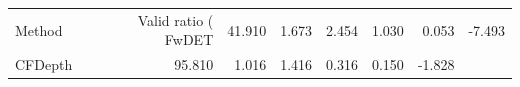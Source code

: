 \begin{tabular}{lrrrrrr}
\toprule
Method & Valid ratio (%
\midrule
FwDET & 41.910 & 1.673 & 2.454 & 1.030 & 0.053 & -7.493 \\
CFDepth & 95.810 & 1.016 & 1.416 & 0.316 & 0.150 & -1.828 \\
\bottomrule
\end{tabular}

